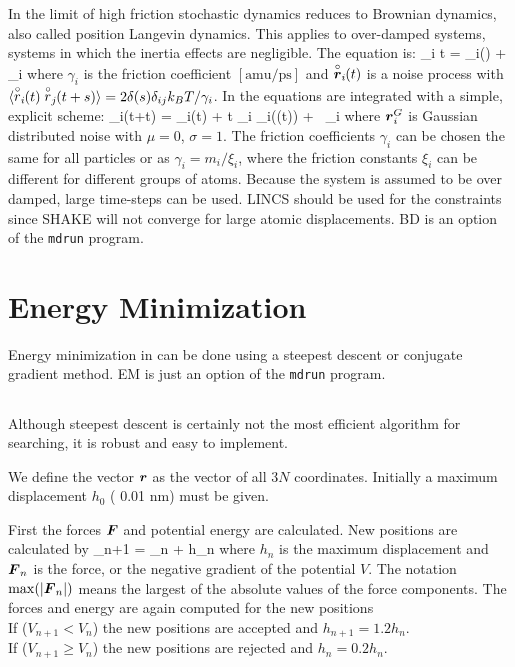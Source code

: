 \section{}
\label{sec:BD}
In the limit of high friction stochastic dynamics reduces to 
Brownian dynamics, also called position Langevin dynamics.
This applies to over-damped systems, 
{\ie} systems in which the inertia effects are negligible.
The equation is:
\beq
{\de {}_i \over \de t} =  _i() + \vrond_i
\eeq 
where $\gamma_i$ is the friction coefficient $[\mbox{amu/ps}]$ and
$\stackrel{\circ}{\mbox{\boldmath ${r}$}}_i\!\!(t)$  is a noise process with 
$\langle \stackrel{\circ}{r}_i\!\!(t) \stackrel{\circ}{r}_j\!\!(t+s) \rangle = 
    2 \delta(s) \delta_{ij} k_B T / \gamma_i$.
In {\gromacs} the equations are integrated with a simple, explicit scheme:
\beq
{}_i(t+\Delta t) = _i(t) +
        {\Delta t \over \gamma_i} _i((t)) 
        + \, \ruis_i 
\eeq
where $\mbox{\boldmath ${r}$}^G_i$ is Gaussian distributed noise with $\mu = 0$, $\sigma = 1$.
The friction coefficients $\gamma_i$ can be chosen the same for all
particles or as $\gamma_i = m_i/\xi_i$, where the friction constants
$\xi_i$ can be different for different groups of atoms. 
Because the system is assumed to be over damped, large time-steps
can be used. LINCS should be used for the constraints since SHAKE
will not converge for large atomic displacements.
BD is an option of the \verb'mdrun' program.

\section{Energy Minimization}
\label{sec:EM}
Energy minimization in {\gromacs} can be done using 
a steepest descent or conjugate gradient method.
EM is just an option of the {\tt mdrun} program.

\subsection{}
Although steepest descent is certainly not the most efficient
algorithm for searching, it is robust and easy to implement.

We define the vector $\mbox{\boldmath ${r}$}$ as the vector of all $3N$ coordinates.
Initially a maximum displacement $h_0$ ({\eg} 0.01 nm) must be given. 

First the forces $\mbox{\boldmath ${F}$}$ and potential energy are calculated.
New positions are calculated by
\beq
{}_{n+1} =  _n +  h_n
\eeq
where $h_n$ is the maximum displacement and $\mbox{\boldmath ${F}$}_n$ is the force,
or the negative gradient of the  potential $V$. The notation $\max
(|\mbox{\boldmath ${F}$}_n|)$ means the largest of the absolute values of the force
components.  The forces and energy are again computed for the new positions \\
If ($V_{n+1} < V_n$) the new positions are accepted and $h_{n+1} = 1.2
h_n$. \\
If ($V_{n+1} \geq V_n$) the new positions are rejected and $h_n = 0.2 h_n$.


